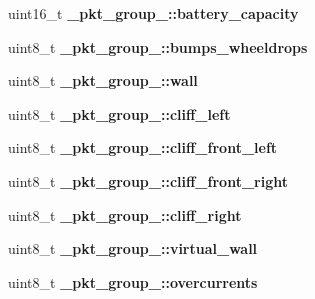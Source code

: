 \begin{DoxyCompactItemize}
\item 
\hypertarget{group__roomba-lib_ga8b4e0c15d144e27ee1e5dc3f0623afcb}{}uint16\+\_\+t {\bfseries \+\_\+pkt\+\_\+group\+\_\+::battery\+\_\+capacity}\label{group__roomba-lib_ga8b4e0c15d144e27ee1e5dc3f0623afcb}

\item 
\hypertarget{group__roomba-lib_gad576e2f36a82ecbb5918f424a7e17188}{}uint8\+\_\+t {\bfseries \+\_\+pkt\+\_\+group\+\_\+::bumps\+\_\+wheeldrops}\label{group__roomba-lib_gad576e2f36a82ecbb5918f424a7e17188}

\item 
\hypertarget{group__roomba-lib_gad985091322f8602c097f7bead6b6cc65}{}uint8\+\_\+t {\bfseries \+\_\+pkt\+\_\+group\+\_\+::wall}\label{group__roomba-lib_gad985091322f8602c097f7bead6b6cc65}

\item 
\hypertarget{group__roomba-lib_ga7cbecdcd7d0ecfc8cfc827721f4e3294}{}uint8\+\_\+t {\bfseries \+\_\+pkt\+\_\+group\+\_\+::cliff\+\_\+left}\label{group__roomba-lib_ga7cbecdcd7d0ecfc8cfc827721f4e3294}

\item 
\hypertarget{group__roomba-lib_ga86de120f341192ccc5029f1efc5a5b45}{}uint8\+\_\+t {\bfseries \+\_\+pkt\+\_\+group\+\_\+::cliff\+\_\+front\+\_\+left}\label{group__roomba-lib_ga86de120f341192ccc5029f1efc5a5b45}

\item 
\hypertarget{group__roomba-lib_ga5bed17d2510c78692af8ab1b676309d0}{}uint8\+\_\+t {\bfseries \+\_\+pkt\+\_\+group\+\_\+::cliff\+\_\+front\+\_\+right}\label{group__roomba-lib_ga5bed17d2510c78692af8ab1b676309d0}

\item 
\hypertarget{group__roomba-lib_ga99123edf9a592989087c67ab8c9f317c}{}uint8\+\_\+t {\bfseries \+\_\+pkt\+\_\+group\+\_\+::cliff\+\_\+right}\label{group__roomba-lib_ga99123edf9a592989087c67ab8c9f317c}

\item 
\hypertarget{group__roomba-lib_gaa9bd9c014a5f805b3a885caa6bcc6a82}{}uint8\+\_\+t {\bfseries \+\_\+pkt\+\_\+group\+\_\+::virtual\+\_\+wall}\label{group__roomba-lib_gaa9bd9c014a5f805b3a885caa6bcc6a82}

\item 
\hypertarget{group__roomba-lib_ga503643688b4890f0e551f1a26b86a20d}{}uint8\+\_\+t {\bfseries \+\_\+pkt\+\_\+group\+\_\+::overcurrents}\label{group__roomba-lib_ga503643688b4890f0e551f1a26b86a20d}


\end{DoxyCompactItemize}
